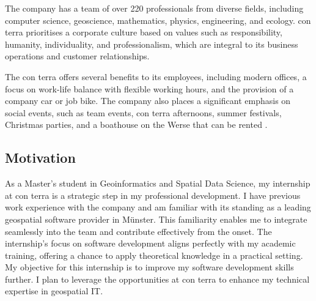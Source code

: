 \documentclass[11pt, titlepage, a4paper]{article}
\begin{document}
The company has a team of over 220 professionals from diverse fields, including computer science, geoscience, mathematics, physics, engineering, and ecology. con terra prioritises a corporate culture based on values such as responsibility, humanity, individuality, and professionalism, which are integral to its business operations and customer relationships.




The con terra offers several benefits to its employees, including modern offices, a focus on work-life balance with flexible working hours, and the provision of a company car or job bike. The company also places a significant emphasis on social events, such as team events, con terra afternoons, summer festivals, Christmas parties, and a boathouse on the Werse that can be rented \cite{conterraUnternehmensubersicht2024}.





\subsection{Motivation}
As a Master's student in Geoinformatics and Spatial Data Science, my internship at con terra is a strategic step in my professional development. I have previous work experience with the company and am familiar with its standing as a leading geospatial software provider in Münster. This familiarity enables me to integrate seamlessly into the team and contribute effectively from the onset. The internship's focus on software development aligns perfectly with my academic training, offering a chance to apply theoretical knowledge in a practical setting. My objective for this internship is to improve my software development skills further. I plan to leverage the opportunities at con terra to enhance my technical expertise in geospatial IT.
\end{document}
